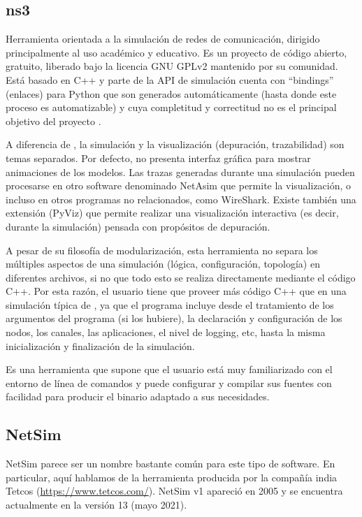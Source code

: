 \subsection{ns3}

Herramienta orientada a la simulación de redes de comunicación, dirigido
principalmente al uso académico y educativo. Es un proyecto de
código abierto, gratuito, liberado bajo la licencia GNU GPLv2 mantenido por su
comunidad. Está basado en C++ y parte de la API de simulación cuenta con
``bindings'' (enlaces) para Python que son generados automáticamente (hasta
donde este proceso es automatizable) y cuya completitud y correctitud no es el
principal objetivo del proyecto \cite{ns3page} \cite{ns3pagepython}.

A diferencia de \omnetpp{}, la simulación y la visualización (depuración,
trazabilidad) son temas separados. Por defecto, no presenta interfaz gráfica
para mostrar animaciones de los modelos. Las trazas generadas durante una
simulación pueden procesarse en otro software denominado NetAsim que permite la
visualización, o incluso en otros programas no relacionados, como WireShark.
Existe también una extensión (PyViz) que permite realizar una visualización
interactiva (es decir, durante la simulación) pensada con propósitos de
depuración.

A pesar de su filosofía de modularización, esta herramienta no separa los
múltiples aspectos de una simulación (lógica, configuración, topología) en
diferentes archivos, si no que todo esto se realiza directamente mediante el
código C++. Por esta razón, el usuario tiene que proveer más código C++ que en
una simulación típica de \omnetpp{}, ya que el programa incluye desde el
tratamiento de los argumentos del programa (si los hubiere), la declaración y
configuración de los nodos, los canales, las aplicaciones, el nivel de logging,
etc, hasta la misma inicialización y finalización de la simulación.

Es una herramienta que supone que el usuario está muy familiarizado con el
entorno de línea de comandos y puede configurar y compilar sus fuentes con
facilidad para producir el binario adaptado a sus necesidades.

\subsection{NetSim}

NetSim parece ser un nombre bastante común para este tipo de software. En
particular, aquí hablamos de la herramienta producida por la compañía india
Tetcos (\url{https://www.tetcos.com/}). NetSim v1 apareció en 2005 y se
encuentra actualmente en la versión 13 (mayo 2021).

